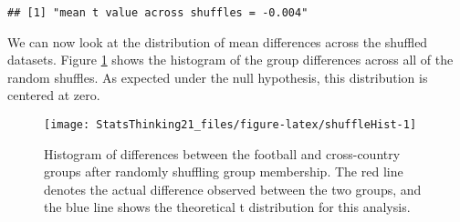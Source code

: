 \documentclass[]{book}
\newenvironment{Shaded}{\begin{snugshade}}{\end{snugshade}}
\newcommand{\KeywordTok}[1]{\textcolor[rgb]{0.13,0.29,0.53}{\textbf{#1}}}
\newcommand{\DataTypeTok}[1]{\textcolor[rgb]{0.13,0.29,0.53}{#1}}
\newcommand{\DecValTok}[1]{\textcolor[rgb]{0.00,0.00,0.81}{#1}}
\newcommand{\StringTok}[1]{\textcolor[rgb]{0.31,0.60,0.02}{#1}}
\newcommand{\CommentTok}[1]{\textcolor[rgb]{0.56,0.35,0.01}{\textit{#1}}}
\newcommand{\OtherTok}[1]{\textcolor[rgb]{0.56,0.35,0.01}{#1}}
\newcommand{\ControlFlowTok}[1]{\textcolor[rgb]{0.13,0.29,0.53}{\textbf{#1}}}
\newcommand{\OperatorTok}[1]{\textcolor[rgb]{0.81,0.36,0.00}{\textbf{#1}}}
\newcommand{\NormalTok}[1]{#1}
\theoremstyle{definition}
\theoremstyle{definition}
\theoremstyle{definition}
\theoremstyle{remark}
\begin{document}
\begin{Shaded}
\end{Shaded}

\begin{verbatim}
## [1] "mean t value across shuffles = -0.004"
\end{verbatim}

We can now look at the distribution of mean differences across the
shuffled datasets. Figure \ref{fig:shuffleHist} shows the histogram of
the group differences across all of the random shuffles. As expected
under the null hypothesis, this distribution is centered at zero.

\begin{figure}
\texttt{[image: StatsThinking21\_files/figure-latex/shuffleHist-1]} \caption{Histogram of differences between the football and cross-country groups after randomly shuffling group membership.  The red line denotes the actual difference observed between the two groups, and the blue line shows the theoretical t distribution for this analysis.}\label{fig:shuffleHist}
\end{figure}
\end{document}
